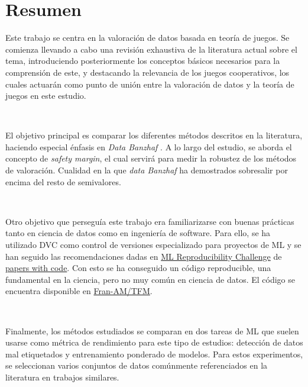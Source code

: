 \chapter{Resumen}
\justifying

Este trabajo  se centra en la valoración de
datos basada en teoría de juegos. Se comienza llevando a cabo
una revisión exhaustiva de la literatura actual sobre el tema,
introduciendo posteriormente los
conceptos básicos necesarios para la comprensión de este, y
destacando la relevancia de los juegos cooperativos, los cuales
actuarán como punto de unión entre la valoración de datos y la teoría
de juegos en este estudio.

\

El objetivo principal es comparar los diferentes métodos
descritos en la literatura, haciendo especial énfasis
en \textit{Data Banzhaf} \cite{dataBanzhaf}. A lo largo
del estudio, se aborda el concepto de \textit{safety margin},
el cual servirá para medir la robustez de los métodos de valoración.
Cualidad en la que \textit{data Banzhaf} ha demostrados sobresalir
por encima del resto de semivalores.

\

Otro objetivo que perseguía este trabajo era familiarizarse
con buenas prácticas tanto en ciencia de datos como en ingeniería
de software. Para ello, se ha utilizado DVC como control de versiones
especializado para proyectos de ML y se han seguido las recomendaciones
dadas en  \href{https://paperswithcode.com/rc2022}
{ML Reproducibility Challenge}
de \href{https://paperswithcode.com/}{papers with code}.
Con esto se ha conseguido un código reproducible, una fundamental
en la ciencia, pero no muy común en ciencia de datos.
El código  se encuentra disponible en
\href{https://github.com/Fran-AM/TFM}{Fran-AM/TFM}.

\

Finalmente, los métodos estudiados se comparan en dos
tareas de ML que suelen usarse como métrica de rendimiento
para este tipo de estudios: detección de datos mal etiquetados y
entrenamiento ponderado de modelos. Para estos experimentos,
se seleccionan varios conjuntos de datos comúnmente
referenciados en la literatura en trabajos similares.

